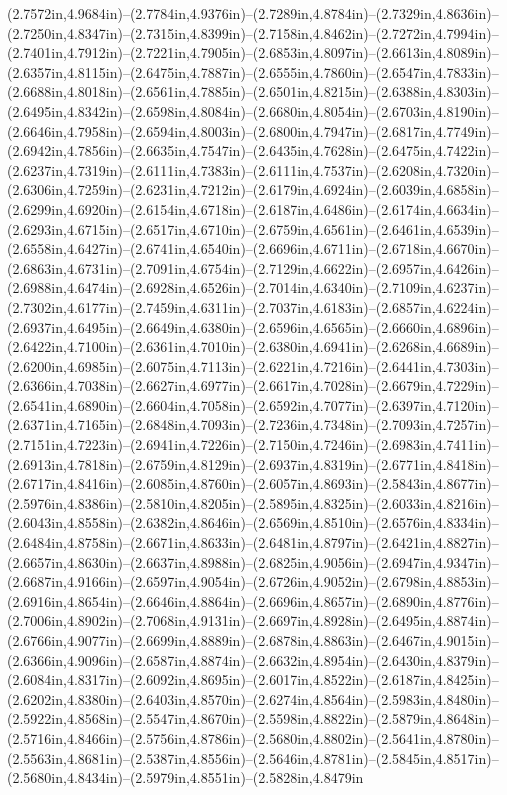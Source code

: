 (2.7572in,4.9684in)--(2.7784in,4.9376in)--(2.7289in,4.8784in)--(2.7329in,4.8636in)--(2.7250in,4.8347in)--(2.7315in,4.8399in)--(2.7158in,4.8462in)--(2.7272in,4.7994in)--(2.7401in,4.7912in)--(2.7221in,4.7905in)--(2.6853in,4.8097in)--(2.6613in,4.8089in)--(2.6357in,4.8115in)--(2.6475in,4.7887in)--(2.6555in,4.7860in)--(2.6547in,4.7833in)--(2.6688in,4.8018in)--(2.6561in,4.7885in)--(2.6501in,4.8215in)--(2.6388in,4.8303in)--(2.6495in,4.8342in)--(2.6598in,4.8084in)--(2.6680in,4.8054in)--(2.6703in,4.8190in)--(2.6646in,4.7958in)--(2.6594in,4.8003in)--(2.6800in,4.7947in)--(2.6817in,4.7749in)--(2.6942in,4.7856in)--(2.6635in,4.7547in)--(2.6435in,4.7628in)--(2.6475in,4.7422in)--(2.6237in,4.7319in)--(2.6111in,4.7383in)--(2.6111in,4.7537in)--(2.6208in,4.7320in)--(2.6306in,4.7259in)--(2.6231in,4.7212in)--(2.6179in,4.6924in)--(2.6039in,4.6858in)--(2.6299in,4.6920in)--(2.6154in,4.6718in)--(2.6187in,4.6486in)--(2.6174in,4.6634in)--(2.6293in,4.6715in)--(2.6517in,4.6710in)--(2.6759in,4.6561in)--(2.6461in,4.6539in)--(2.6558in,4.6427in)--(2.6741in,4.6540in)--(2.6696in,4.6711in)--(2.6718in,4.6670in)--(2.6863in,4.6731in)--(2.7091in,4.6754in)--(2.7129in,4.6622in)--(2.6957in,4.6426in)--(2.6988in,4.6474in)--(2.6928in,4.6526in)--(2.7014in,4.6340in)--(2.7109in,4.6237in)--(2.7302in,4.6177in)--(2.7459in,4.6311in)--(2.7037in,4.6183in)--(2.6857in,4.6224in)--(2.6937in,4.6495in)--(2.6649in,4.6380in)--(2.6596in,4.6565in)--(2.6660in,4.6896in)--(2.6422in,4.7100in)--(2.6361in,4.7010in)--(2.6380in,4.6941in)--(2.6268in,4.6689in)--(2.6200in,4.6985in)--(2.6075in,4.7113in)--(2.6221in,4.7216in)--(2.6441in,4.7303in)--(2.6366in,4.7038in)--(2.6627in,4.6977in)--(2.6617in,4.7028in)--(2.6679in,4.7229in)--(2.6541in,4.6890in)--(2.6604in,4.7058in)--(2.6592in,4.7077in)--(2.6397in,4.7120in)--(2.6371in,4.7165in)--(2.6848in,4.7093in)--(2.7236in,4.7348in)--(2.7093in,4.7257in)--(2.7151in,4.7223in)--(2.6941in,4.7226in)--(2.7150in,4.7246in)--(2.6983in,4.7411in)--(2.6913in,4.7818in)--(2.6759in,4.8129in)--(2.6937in,4.8319in)--(2.6771in,4.8418in)--(2.6717in,4.8416in)--(2.6085in,4.8760in)--(2.6057in,4.8693in)--(2.5843in,4.8677in)--(2.5976in,4.8386in)--(2.5810in,4.8205in)--(2.5895in,4.8325in)--(2.6033in,4.8216in)--(2.6043in,4.8558in)--(2.6382in,4.8646in)--(2.6569in,4.8510in)--(2.6576in,4.8334in)--(2.6484in,4.8758in)--(2.6671in,4.8633in)--(2.6481in,4.8797in)--(2.6421in,4.8827in)--(2.6657in,4.8630in)--(2.6637in,4.8988in)--(2.6825in,4.9056in)--(2.6947in,4.9347in)--(2.6687in,4.9166in)--(2.6597in,4.9054in)--(2.6726in,4.9052in)--(2.6798in,4.8853in)--(2.6916in,4.8654in)--(2.6646in,4.8864in)--(2.6696in,4.8657in)--(2.6890in,4.8776in)--(2.7006in,4.8902in)--(2.7068in,4.9131in)--(2.6697in,4.8928in)--(2.6495in,4.8874in)--(2.6766in,4.9077in)--(2.6699in,4.8889in)--(2.6878in,4.8863in)--(2.6467in,4.9015in)--(2.6366in,4.9096in)--(2.6587in,4.8874in)--(2.6632in,4.8954in)--(2.6430in,4.8379in)--(2.6084in,4.8317in)--(2.6092in,4.8695in)--(2.6017in,4.8522in)--(2.6187in,4.8425in)--(2.6202in,4.8380in)--(2.6403in,4.8570in)--(2.6274in,4.8564in)--(2.5983in,4.8480in)--(2.5922in,4.8568in)--(2.5547in,4.8670in)--(2.5598in,4.8822in)--(2.5879in,4.8648in)--(2.5716in,4.8466in)--(2.5756in,4.8786in)--(2.5680in,4.8802in)--(2.5641in,4.8780in)--(2.5563in,4.8681in)--(2.5387in,4.8556in)--(2.5646in,4.8781in)--(2.5845in,4.8517in)--(2.5680in,4.8434in)--(2.5979in,4.8551in)--(2.5828in,4.8479in